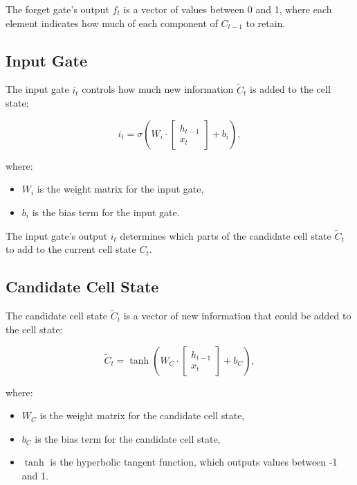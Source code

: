 \documentclass{article}
\begin{document}
The forget gate's output \( f_t \) is a vector of values between 0 and 1, where each element indicates how much of each component of \( C_{t-1} \) to retain.

\subsection{Input Gate}
The input gate \( i_t \) controls how much new information \( \tilde{C}_t \) is added to the cell state:

\begin{equation}
    i_t = \sigma \left( W_i \cdot \begin{bmatrix} h_{t-1} \\ x_t \end{bmatrix} + b_i \right),
\end{equation}

where:
\begin{itemize}
    \item \( W_i \) is the weight matrix for the input gate,
    \item \( b_i \) is the bias term for the input gate.
\end{itemize}

The input gate's output \( i_t \) determines which parts of the candidate cell state \( \tilde{C}_t \) to add to the current cell state \( C_t \).

\subsection{Candidate Cell State}
The candidate cell state \( \tilde{C}_t \) is a vector of new information that could be added to the cell state:

\begin{equation}
    \tilde{C}_t = \tanh \left( W_C \cdot \begin{bmatrix} h_{t-1} \\ x_t \end{bmatrix} + b_C \right),
\end{equation}

where:
\begin{itemize}
    \item \( W_C \) is the weight matrix for the candidate cell state,
    \item \( b_C \) is the bias term for the candidate cell state,
    \item \( \tanh \) is the hyperbolic tangent function, which outputs values between -1 and 1.
\end{itemize}
\end{document}
